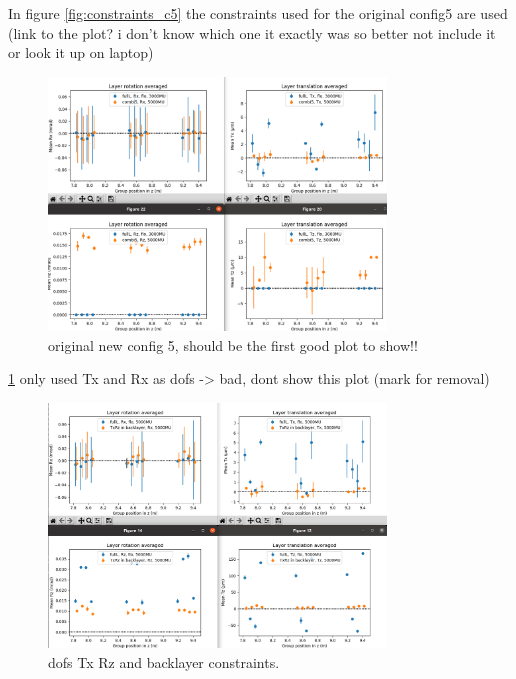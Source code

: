 In figure \ref{fig:constraints_c5} the constraints used for the original config5 are used (link to the plot? i don't know which one it exactly was so better not include it or look it up on laptop)

\begin{figure}
  \centering
  \includegraphics[width=0.8\textwidth]{plots/august_13/newCombi5.png}
  \caption{original new config 5, should be the first good plot to show!!}
  \label{fig:OGconfig5}
\end{figure}

\ref{fig:OGconfig5} only used Tx and Rx as dofs -> bad, dont show this plot (mark for removal)



\begin{figure}
  \centering
  \includegraphics[width=0.8\textwidth]{plots/oct_4/TxRz_config5_backlayer.png}
  \caption{dofs Tx Rz and backlayer constraints.}
  \label{fig:oct4}
\end{figure}

